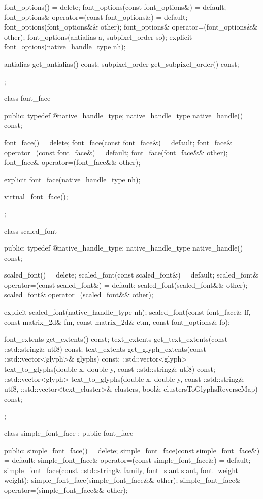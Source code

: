 \begin{codeblock}
{{{{{    font_options() = delete;
    font_options(const font_options&) = default;
    font_options& operator=(const font_options&) = default;
    font_options(font_options&& other);
    font_options& operator=(font_options&& other);
    font_options(antialias a, subpixel_order so);
    explicit font_options(native_handle_type nh);

    antialias get_antialias() const;
    subpixel_order get_subpixel_order() const;
  };

  class font_face {
  public:
    typedef @\impdef@ native_handle_type;
    native_handle_type native_handle() const;

    font_face() = delete;
    font_face(const font_face&) = default;
    font_face& operator=(const font_face&) = default;
    font_face(font_face&& other);
    font_face& operator=(font_face&& other);

    explicit font_face(native_handle_type nh);

    virtual ~font_face();
  };

  class scaled_font {
  public:
    typedef @\impdef@ native_handle_type;
    native_handle_type native_handle() const;

    scaled_font() = delete;
    scaled_font(const scaled_font&) = default;
    scaled_font& operator=(const scaled_font&) = default;
    scaled_font(scaled_font&& other);
    scaled_font& operator=(scaled_font&& other);

    explicit scaled_font(native_handle_type nh);
    scaled_font(const font_face& ff, const matrix_2d& fm, const matrix_2d& ctm, 
    const font_options& fo);

    font_extents get_extents() const;
    text_extents get_text_extents(const ::std::string& utf8) const;
    text_extents get_glyph_extents(const ::std::vector<glyph>& glyphs) const;
    ::std::vector<glyph> text_to_glyphs(double x, double y, const 
    ::std::string& utf8) const;
    ::std::vector<glyph> text_to_glyphs(double x, double y, const 
    ::std::string& utf8, ::std::vector<text_cluster>& clusters, bool& 
    clustersToGlyphsReverseMap) const;
  };

  class simple_font_face : public font_face {
  public:
    simple_font_face() = delete;
    simple_font_face(const simple_font_face&) = default;
    simple_font_face& operator=(const simple_font_face&) = default;
    simple_font_face(const ::std::string& family, font_slant slant, font_weight 
    weight);
    simple_font_face(simple_font_face&& other);
    simple_font_face& operator=(simple_font_face&& other);

}}}}}
\end{codeblock}
